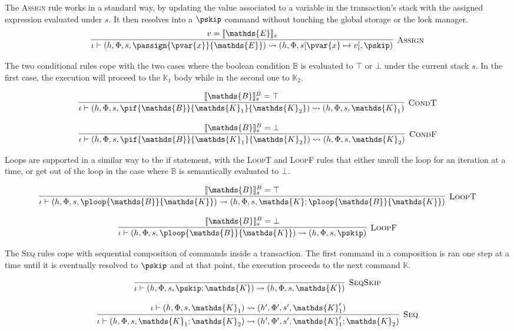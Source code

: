 The \textsc{Assign} rule works in a standard way, by updating the value associated to a variable in the transaction's stack with the assigned expression evaluated under $s$. It then resolves into a $\pskip$ command without touching the global storage or the lock manager.
\[
\infer[\textsc{Assign}]
{
	\iota \vdash (h, \Phi, s, \passign{\pvar{x}}{\mathds{E}})
	\rightsquigarrow
	(h, \Phi, s[\pvar{x} \mapsto v], \pskip)
}
{
	v = \llbracket \mathds{E} \rrbracket_s
}
\]

The two conditional rules cope with the two cases where the boolean condition $\mathds{B}$ is evaluated to $\top$ or $\bot$ under the current stack $s$. In the first case, the execution will proceed to the $\mathds{K}_1$ body while in the second one to $\mathds{K}_2$.

\[
\infer[\textsc{CondT}]
{
	\iota \vdash (h, \Phi, s, \pif{\mathds{B}}{\mathds{K}_1}{\mathds{K}_2})
	\rightsquigarrow
	(h, \Phi, s, \mathds{K}_1)
}
{
	\llbracket \mathds{B} \rrbracket_s^B = \top
}
\]

\[
\infer[\textsc{CondF}]
{
	\iota \vdash (h, \Phi, s, \pif{\mathds{B}}{\mathds{K}_1}{\mathds{K}_2})
	\rightsquigarrow
	(h, \Phi, s, \mathds{K}_2)
}
{
	\llbracket \mathds{B} \rrbracket_s^B = \bot
}
\]

Loops are supported in a similar way to the if statement, with the \textsc{LoopT} and \textsc{LoopF} rules that either unroll the loop for an iteration at a time, or get out of the loop in the case where $\mathds{B}$ is semantically evaluated to $\bot$.

\[
\infer[\textsc{LoopT}]
{
	\iota \vdash (h, \Phi, s, \ploop{\mathds{B}}{\mathds{K}})
	\rightsquigarrow
	(h, \Phi, s, \mathds{K}; \ploop{\mathds{B}}{\mathds{K}})
}
{
	\llbracket \mathds{B} \rrbracket_s^B = \top
}
\]

\[
\infer[\textsc{LoopF}]
{
	\iota \vdash (h, \Phi, s, \ploop{\mathds{B}}{\mathds{K}})
	\rightsquigarrow
	(h, \Phi, s, \pskip)
}
{
	\llbracket \mathds{B} \rrbracket_s^B = \bot
}
\]

The \textsc{Seq} rules cope with sequential composition of commands inside a transaction. The first command in a composition is ran one step at a time until it is eventually resolved to $\pskip$ and at that point, the execution proceeds to the next command $\mathds{K}$.

\[
\infer[\textsc{SeqSkip}]
{
	\iota \vdash (h, \Phi, s, \pskip ; \mathds{K})
	\rightsquigarrow
	(h, \Phi, s, \mathds{K})
}
{}
\]

\[
\infer[\textsc{Seq}]
{
	\iota \vdash (h, \Phi, s, \mathds{K}_1 ; \mathds{K}_2)
	\rightsquigarrow
	(h', \Phi', s', \mathds{K}_1' ; \mathds{K}_2)
}
{
	\iota \vdash (h, \Phi, s, \mathds{K}_1)
	\rightsquigarrow
	(h', \Phi', s', \mathds{K}_1')
}
\]

